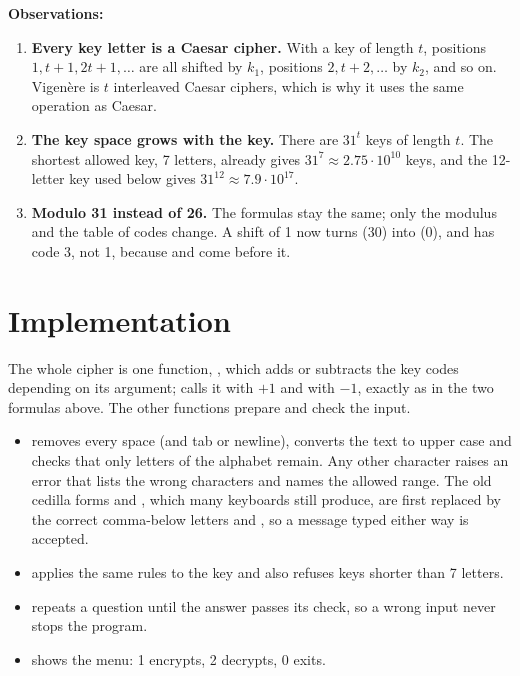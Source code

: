 \documentclass[11pt,a4paper]{article}
\begin{document}
\textbf{Observations:}
\begin{enumerate}
  \item \textbf{Every key letter is a Caesar cipher.} With a key of length $t$, positions $1, t+1,
  2t+1, \dots$ are all shifted by $k_1$, positions $2, t+2, \dots$ by $k_2$, and so on. Vigenère
  is $t$ interleaved Caesar ciphers, which is why it uses the same operation as Caesar.
  \item \textbf{The key space grows with the key.} There are $31^t$ keys of length $t$. The
  shortest allowed key, 7 letters, already gives $31^7 \approx 2.75 \cdot 10^{10}$ keys, and the
  12-letter key used below gives $31^{12} \approx 7.9 \cdot 10^{17}$.
  \item \textbf{Modulo 31 instead of 26.} The formulas stay the same; only the modulus and the
  table of codes change. A shift of 1 now turns  (30) into  (0), and  has
  code 3, not 1, because  and  come before it.
\end{enumerate}

\section{Implementation}

The whole cipher is one function, , which adds or subtracts the key codes depending on
its  argument;  calls it with $+1$ and  with $-1$, exactly
as in the two formulas above. The other functions prepare and check the input.

\begin{itemize}
  \item {} removes every space (and tab or newline), converts the text to upper case and
  checks that only letters of the alphabet remain. Any other character raises an error that lists
  the wrong characters and names the allowed range. The old cedilla forms  and ,
  which many keyboards still produce, are first replaced by the correct comma-below letters
   and , so a message typed either way is accepted.
  \item {} applies the same rules to the key and also refuses keys shorter than 7
  letters.
  \item {} repeats a question until the answer passes its check, so a wrong input never
  stops the program.
  \item {} shows the menu: 1 encrypts, 2 decrypts, 0 exits.
\end{itemize}
\end{document}
